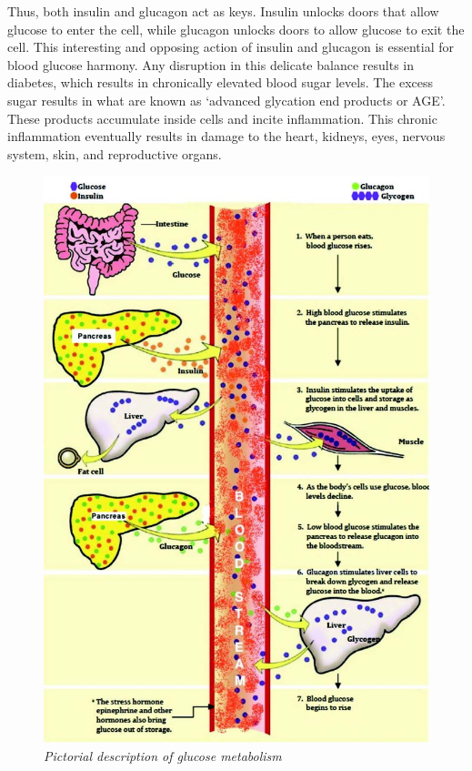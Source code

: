 Thus, both insulin and glucagon act as keys. Insulin unlocks doors that allow glucose to enter the cell, while glucagon unlocks doors to allow glucose to exit the cell. This interesting and opposing action of insulin and glucagon is essential for blood glucose harmony. Any disruption in this delicate balance results in diabetes, which results in chronically elevated blood sugar levels. The excess sugar results in what are known as ‘advanced glycation end products or AGE’. These products accumulate inside cells and incite inflammation. This chronic inflammation eventually results in damage to the heart, kidneys, eyes, nervous system, skin, and reproductive organs.

\begin{figure}
\includegraphics{images/018.jpg}
\caption{\textit{Pictorial description of glucose metabolism}}
\end{figure}

